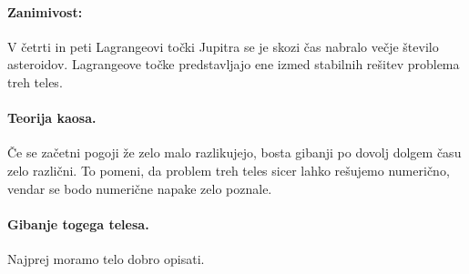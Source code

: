 \documentclass[a4paper]{article}
\begin{document}
\paragraph{Zanimivost:} V četrti in peti Lagrangeovi točki Jupitra se je skozi čas nabralo večje število asteroidov. Lagrangeove točke predstavljajo ene izmed stabilnih rešitev problema treh teles.
\paragraph{Teorija kaosa.} Če se začetni pogoji že zelo malo razlikujejo, bosta gibanji po dovolj dolgem času zelo različni.
To pomeni, da problem treh teles sicer lahko rešujemo numerično, vendar se bodo numerične napake zelo poznale.
\paragraph{Gibanje togega telesa.} Najprej moramo telo dobro opisati.
\end{document}
